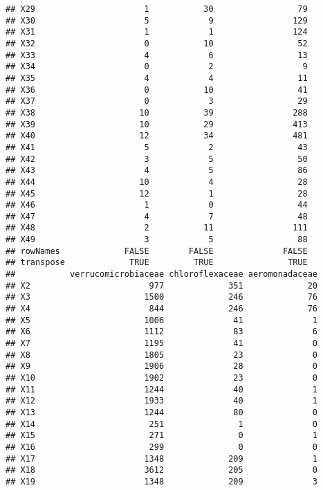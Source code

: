 \documentclass[12pt]{beamer}\usepackage[]{graphicx}\usepackage[]{color}
\makeatletter
\newenvironment{kframe}{%
 \def\at@end@of@kframe{}%
 \ifinner\ifhmode%
  \def\at@end@of@kframe{\end{minipage}}%
  \begin{minipage}{\columnwidth}%
 \fi\fi%
 \def\FrameCommand##1{\hskip\@totalleftmargin \hskip-\fboxsep
 \colorbox{shadecolor}{##1}\hskip-\fboxsep
     \hskip-\linewidth \hskip-\@totalleftmargin \hskip\columnwidth}%
 \MakeFramed {\advance\hsize-\width
   \@totalleftmargin\z@ \linewidth\hsize
   \@setminipage}}%
 {\par\unskip\endMakeFramed%
 \at@end@of@kframe}
\newenvironment{knitrout}{}{} %
\makeatother
\begin{document}
\begin{frame}[fragile]
\begin{knitrout}
\begin{kframe}
\begin{verbatim}
## X29                      1           30                 79
## X30                      5            9                129
## X31                      1            1                124
## X32                      0           10                 52
## X33                      4            6                 13
## X34                      0            2                  9
## X35                      4            4                 11
## X36                      0           10                 41
## X37                      0            3                 29
## X38                     10           39                288
## X39                     10           29                413
## X40                     12           34                481
## X41                      5            2                 43
## X42                      3            5                 50
## X43                      4            5                 86
## X44                     10            4                 28
## X45                     12            1                 28
## X46                      1            0                 44
## X47                      4            7                 48
## X48                      2           11                111
## X49                      3            5                 88
## rowNames             FALSE        FALSE              FALSE
## transpose             TRUE         TRUE               TRUE
##           verrucomicrobiaceae chloroflexaceae aeromonadaceae
## X2                        977             351             20
## X3                       1500             246             76
## X4                        844             246             76
## X5                       1006              41              1
## X6                       1112              83              6
## X7                       1195              41              0
## X8                       1805              23              0
## X9                       1906              28              0
## X10                      1902              23              0
## X11                      1244              40              1
## X12                      1933              40              1
## X13                      1244              80              0
## X14                       251               1              0
## X15                       271               0              1
## X16                       299               0              0
## X17                      1348             209              1
## X18                      3612             205              0
## X19                      1348             209              3

\end{verbatim}
\end{kframe}
\end{knitrout}
\end{frame}
\end{document}
